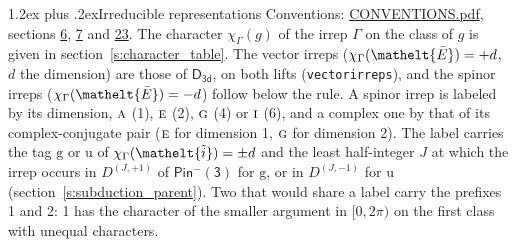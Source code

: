 \documentclass[10pt,a4paper]{article}
\makeatletter
\renewcommand\section{\@startsection{section}{1}{\z@}{-3ex plus -1ex minus -.2ex}%
  {1.2ex plus .2ex}{\normalfont\large\sffamily\bfseries\color{parttitle}}}
\numberwithin{equation}{section}
\newcommand{\eltfont}[1]{{\let\sigma\eltsigma\mathelt{#1}}}
\newcommand{\grp}[1]{\mathsf{#1}}
\newcommand{\irr}[1]{\text{\normalfont\scshape #1}}
\newcommand{\elt}[1]{\eltfont{#1}}
\newcommand{\ptag}[1]{\mathrm{#1}}
\newcommand{\irrJp}[2]{D^{(#1,#2)}}
\newcommand{\irchar}[1]{\chi_{#1}}
\newcommand{\barred}[1]{\bar{#1}}
\newcommand{\lift}[1]{\tilde{#1}}
\makeatother
\begin{document}
\section{Irreducible representations}\label{s:irreps}
Conventions: \href{../../CONVENTIONS.pdf}{CONVENTIONS.pdf}, sections \href{../../../rotation/CONVENTIONS.pdf\#conv.6}{6}, \href{../../../rotation/CONVENTIONS.pdf\#conv.7}{7} and \href{../../CONVENTIONS.pdf\#conv.23}{23}.
\leavevmode\label{n:function.character}\label{n:irrep.Gamma}The character $\irchar{\Gamma}(g)$ of the irrep $\Gamma$ on the class of $g$ is given in section~\ref{s:character_table}. \label{n:index.dimension}The vector irreps ($\irchar{\Gamma}(\elt{\barred{E}}) = +d$, $d$ the dimension) are those of \href{../../../rotation/data/pdf/D3d.pdf}{$\grp{D_{3d}}$}, on both lifts (\texttt{vectorirreps}), and the spinor irreps ($\irchar{\Gamma}(\elt{\barred{E}}) = -d$) follow below the rule. A spinor irrep is labeled by its dimension, $\irr{a}$ (1), $\irr{e}$ (2), $\irr{g}$ (4) or $\irr{i}$ (6), and a complex one by that of its complex-conjugate pair ($\irr{e}$ for dimension 1, $\irr{g}$ for dimension 2). The label carries the tag $\ptag{g}$ or $\ptag{u}$ of $\irchar{\Gamma}(\elt{\lift{i}}) = \pm d$ and the least half-integer $J$ at which the irrep occurs in $\irrJp{J}{+1}$ of $\grp{Pin^{-}(3)}$ for $\ptag{g}$, or in $\irrJp{J}{-1}$ for $\ptag{u}$ (section~\ref{s:subduction_parent}). Two that would share a label carry the prefixes 1 and 2: 1 has the character of the smaller argument in $[0, 2\pi)$ on the first class with unequal characters.
\end{document}
